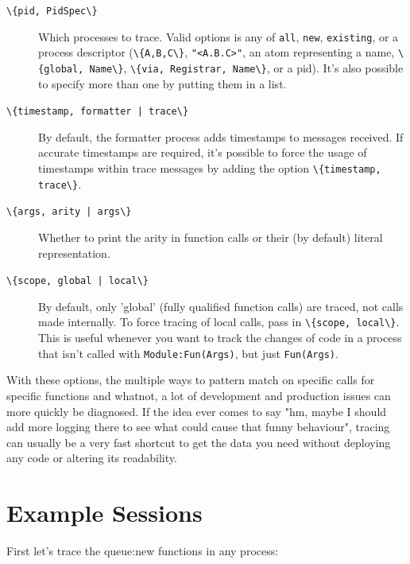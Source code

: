 \documentclass[11pt, oneside]{book}   	%
\newcommand{\expression}[1]{\Verb`#1`}
\newcommand{\term}[1]{\Verb`#1`}
\begin{document}
\begin{description}
	\item[\expression{\{pid, PidSpec\}}] \hfill
	
		Which processes to trace. Valid options is any of \term{all}, \term{new}, \term{existing}, or a process descriptor (\expression{\{A,B,C\}}, \expression{"<A.B.C>"}, an atom representing a name, \expression{\{global, Name\}}, \expression{\{via, Registrar, Name\}}, or a pid). It's also possible to specify more than one by putting them in a list.
		
	\item[\expression{\{timestamp, formatter | trace\}}] \hfill
	
		By default, the formatter process adds timestamps to messages received. If accurate timestamps are required, it's possible to force the usage of timestamps within trace messages by adding the option \expression{\{timestamp, trace\}}.
		
	\item[\expression{\{args, arity | args\}}] \hfill
	
		Whether to print the arity in function calls or their (by default) literal representation.
		
 	\item[\expression{\{scope, global | local\}}] \hfill
	
		By default, only 'global' (fully qualified function calls) are traced, not calls made internally. To force tracing of local calls, pass in \expression{\{scope, local\}}. This is useful whenever you want to track the changes of code in a process that isn't called with \expression{Module:Fun(Args)}, but just \expression{Fun(Args)}.
\end{description}

With these options, the multiple ways to pattern match on specific calls for specific functions and whatnot, a lot of development and production issues can more quickly be diagnosed. If the idea ever comes to say "hm, maybe I should add more logging there to see what could cause that funny behaviour", tracing can usually be a very fast shortcut to get the data you need without deploying any code or altering its readability.


\section{Example Sessions}

First let's trace the queue:new functions in any process:
\end{document}
